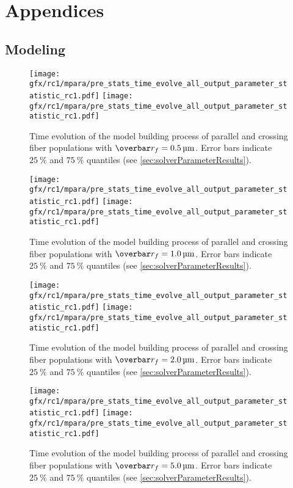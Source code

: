 \newpage\null\thispagestyle{empty}\newpage
\clearpage{\thispagestyle{empty}\cleardoublepage}
\part{Appendices}
%
\chapter{Modeling}
\label{app:modelAnalysis}
%
\setlength{\tikzwidth}{\textwidth}
\begin{sidewaysfigure}[!p]
    \centering
    \texttt{[image: gfx/rc1/mpara/pre\_stats\_time\_evolve\_all\_output\_parameter\_statistic\_rc1.pdf]}
    \texttt{[image: gfx/rc1/mpara/pre\_stats\_time\_evolve\_all\_output\_parameter\_statistic\_rc1.pdf]}
    \label{app:pste1}
    \caption{Time evolution of the model building process of parallel and crossing fiber populations with $\fiberRadiusMean=\SI{0.5}{\micro\meter}$. Error bars indicate $\SI{25}{\percent}$ and $\SI{75}{\percent}$ quantiles (see \cref{sec:solverParameterResults}).}
\end{sidewaysfigure}
%
\begin{sidewaysfigure}[!p]
    \centering
    \texttt{[image: gfx/rc1/mpara/pre\_stats\_time\_evolve\_all\_output\_parameter\_statistic\_rc1.pdf]}
    \texttt{[image: gfx/rc1/mpara/pre\_stats\_time\_evolve\_all\_output\_parameter\_statistic\_rc1.pdf]}
    \label{app:pste2}
    \caption{Time evolution of the model building process of parallel and crossing fiber populations with $\fiberRadiusMean=\SI{1.0}{\micro\meter}$. Error bars indicate $\SI{25}{\percent}$ and $\SI{75}{\percent}$ quantiles (see \cref{sec:solverParameterResults}).}
\end{sidewaysfigure}
%
\begin{sidewaysfigure}[!p]
    \centering
    \texttt{[image: gfx/rc1/mpara/pre\_stats\_time\_evolve\_all\_output\_parameter\_statistic\_rc1.pdf]}
    \texttt{[image: gfx/rc1/mpara/pre\_stats\_time\_evolve\_all\_output\_parameter\_statistic\_rc1.pdf]}
    \label{app:pste3}
    \caption{Time evolution of the model building process of parallel and crossing fiber populations with $\fiberRadiusMean=\SI{2.0}{\micro\meter}$. Error bars indicate $\SI{25}{\percent}$ and $\SI{75}{\percent}$ quantiles (see \cref{sec:solverParameterResults}).}
\end{sidewaysfigure}
%
\begin{sidewaysfigure}[!p]
    \centering
    \texttt{[image: gfx/rc1/mpara/pre\_stats\_time\_evolve\_all\_output\_parameter\_statistic\_rc1.pdf]}
    \texttt{[image: gfx/rc1/mpara/pre\_stats\_time\_evolve\_all\_output\_parameter\_statistic\_rc1.pdf]}
    \label{app:pste4}
    \caption{Time evolution of the model building process of parallel and crossing fiber populations with $\fiberRadiusMean=\SI{5.0}{\micro\meter}$. Error bars indicate $\SI{25}{\percent}$ and $\SI{75}{\percent}$ quantiles (see \cref{sec:solverParameterResults}).}
\end{sidewaysfigure}
